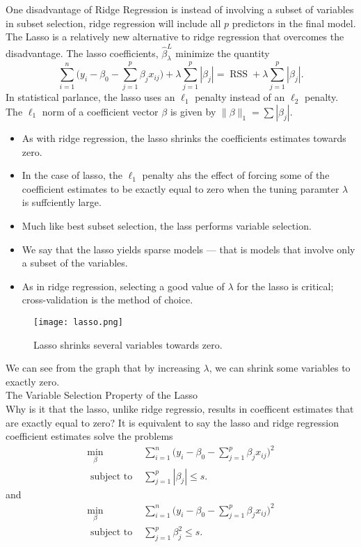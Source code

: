 \documentclass[11pt, a4paper]{article}
\begin{document}
One disadvantage of Ridge Regression is instead of involving a subset of variables in subset selection, ridge regression will include all $p$ predictors in the final model.\\
The Lasso is a relatively new alternative to ridge regression that overcomes the disadvantage. The lasso coefficients, $\hat{\beta}_\lambda^L$ minimize the quantity
\[
  \sum_{i=1}^n\bigg(y_i-\beta_0-\sum_{j=1}^p\beta_jx_{ij}\bigg)+\lambda\sum_{j=1}^p|\beta_j|=\operatorname{RSS}+\lambda\sum_{j=1}^p|\beta_j|.
\]
In statistical parlance, the lasso uses an $\ell_1$ penalty instead of an $\ell_2$ penalty. The $\ell_1$ norm of a coefficient vector $\beta$ is given by $\|\beta\|_1=\sum|\beta_j|$.
\begin{itemize}
\item As with ridge regression, the lasso shrinks the coefficients estimates towards zero.
\item In the case of lasso, the $\ell_1$ penalty ahs the effect of forcing some of the coefficient estimates to be exactly equal to zero when the tuning paramter $\lambda$ is suffciently large.
\item Much like best subset selection, the lass performs variable selection.
\item We say that the lasso yields sparse models --- that is models that involve only a subset of the variables.
\item As in ridge regression, selecting a good value of $\lambda$ for the lasso is critical; cross-validation is the method of choice.
\end{itemize}
\begin{figure}
[h!]
\centering
\texttt{[image: lasso.png]}
\caption{Lasso shrinks several variables towards zero.}
\end{figure}
We can see from the graph that by increasing $\lambda$, we can shrink some variables to exactly zero.\\
The Variable Selection Property of the Lasso\\
Why is it that the lasso, unlike ridge regressio, results in coefficent estimates that are exactly equal to zero? It is equivalent to say the lasso and ridge regression coefficient estimates solve the problems
\begin{align}
  \min_\beta&\sum_{i=1}^n\bigg(y_i-\beta_0-\sum_{j=1}^p\beta_jx_{ij}\bigg)^2\\
  \text{ subject to }& \sum_{j=1}^p|\beta_j|\leq s.
\end{align}
and 
\begin{align}
  \min_\beta&\sum_{i=1}^n\bigg(y_i-\beta_0-\sum_{j=1}^p\beta_jx_{ij}\bigg)^2\\
  \text{ subject to }& \sum_{j=1}^p\beta_j^2\leq s.
\end{align}
\end{document}

